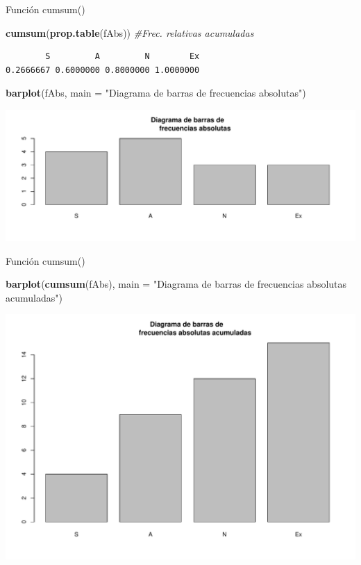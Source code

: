 \documentclass[
  ignorenonframetext,
]{beamer}
\newenvironment{Shaded}{\begin{snugshade}}{\end{snugshade}}
\newcommand{\AttributeTok}[1]{\textcolor[rgb]{0.13,0.29,0.53}{#1}}
\newcommand{\CommentTok}[1]{\textcolor[rgb]{0.56,0.35,0.01}{\textit{#1}}}
\newcommand{\FunctionTok}[1]{\textcolor[rgb]{0.13,0.29,0.53}{\textbf{#1}}}
\newcommand{\NormalTok}[1]{#1}
\newcommand{\StringTok}[1]{\textcolor[rgb]{0.31,0.60,0.02}{#1}}
\begin{document}
\begin{frame}[fragile]{Función cumsum()}
\label{funciuxf3n-cumsum-1}
\begin{Shaded}
\begin{Highlighting}[]
\FunctionTok{cumsum}\NormalTok{(}\FunctionTok{prop.table}\NormalTok{(fAbs)) }\CommentTok{\#Frec. relativas acumuladas}
\end{Highlighting}
\end{Shaded}

\begin{verbatim}
        S         A         N        Ex 
0.2666667 0.6000000 0.8000000 1.0000000 
\end{verbatim}

\begin{Shaded}
\begin{Highlighting}[]
\FunctionTok{barplot}\NormalTok{(fAbs, }\AttributeTok{main =} \StringTok{"Diagrama de barras de}
\StringTok{        frecuencias absolutas"}\NormalTok{)}
\end{Highlighting}
\end{Shaded}

\includegraphics[width=0.8\linewidth]{R_base_files/figure-beamer/unnamed-chunk-112-1}
\end{frame}

\begin{frame}[fragile]{Función cumsum()}
\label{funciuxf3n-cumsum-2}
\begin{Shaded}
\begin{Highlighting}[]
\FunctionTok{barplot}\NormalTok{(}\FunctionTok{cumsum}\NormalTok{(fAbs), }
        \AttributeTok{main =} \StringTok{"Diagrama de barras de }
\StringTok{        frecuencias absolutas acumuladas"}\NormalTok{)}
\end{Highlighting}
\end{Shaded}

\includegraphics[width=0.8\linewidth]{R_base_files/figure-beamer/unnamed-chunk-113-1}
\end{frame}
\end{document}
